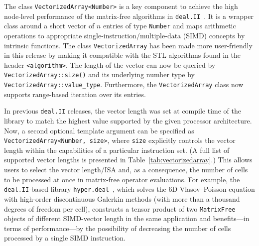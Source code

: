 \documentclass{ansarticle-preprint}
\newcommand{\specialword}[1]{\texttt{#1}}
\newcommand{\dealii}{{\specialword{deal.II}}\xspace}
\begin{document}
The class \texttt{VectorizedArray<Number>} is a key component to achieve the high
node-level performance of the matrix-free algorithms in \dealii{}~\cite{KronbichlerKormann2012, KronbichlerKormann2019}. It is a wrapper
class around a short vector of $n$ entries of type \texttt{Number} and maps
arithmetic operations to appropriate single-instruction/multiple-data (SIMD)
concepts by intrinsic functions.
The class \texttt{VectorizedArray} has been made more user-friendly in this release by making
it compatible with the STL algorithms found in the header \texttt{<algorithm>}.
The length of the  vector can now be queried by  \texttt{VectorizedArray::size()} and its underlying number type by \texttt{VectorizedArray::value\_type}.
Furthermore, the \texttt{VectorizedArray} class now supports range-based iteration over its entries.

In previous \dealii{} releases, the
vector length was set at compile time of the library to match the highest
value supported by the given processor architecture.
Now, a second optional template argument
can be specified as \texttt{VectorizedArray<Number, size>}, where \texttt{size} explicitly controls
the vector length within the capabilities of a particular instruction set.
(A full list of supported
vector lengths is presented in Table~\ref{tab:vectorizedarray}.)
This allows users to select the vector length/ISA and,
as a consequence, the number of cells to be processed at once in matrix-free
operator evaluations. For example, the \dealii{}-based
library \texttt{hyper.deal}~\cite{munch2020hyperdeal}, which solves the 6D Vlasov--Poisson equation with high-order
discontinuous Galerkin methods (with more than a thousand degrees of freedom per cell), constructs a tensor product of two \texttt{MatrixFree} objects of different SIMD-vector
length in the same application and benefits---in terms of performance---by the possibility of decreasing the number of cells processed by a single SIMD instruction.
\end{document}
